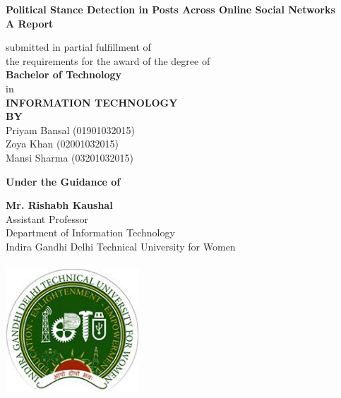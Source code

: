 \documentclass[a4paper,11pt]{article}
\begin{document}

\thispagestyle{empty} %

\begin{spacing}{1.5}
\begin{center}

{\LARGE \bfseries
Political Stance Detection in Posts Across Online Social Networks}
\medskip\\
\textbf{A Report}
\begin{center}
submitted in partial fulfillment of\\ 
the requirements for the award of the degree of\\
\textbf{Bachelor of Technology}
\medskip\\
in\\
\textbf{INFORMATION TECHNOLOGY}\\
\textbf{BY}
\medskip\\
Priyam Bansal (01901032015)\\
Zoya Khan (02001032015)\\
Mansi Sharma (03201032015)\\
\end{center}
\begin{center}
\textbf{Under the Guidance of}\\
\end{center}
\begin{center}
\textbf{Mr. Rishabh Kaushal}\\
Assistant Professor\\
Department of Information Technology\\
Indira Gandhi Delhi Technical University for Women
\end{center}
\vspace*{10mm}

\includegraphics[height=5cm,width=5cm]{igdtuw_logo.jpg}


\end{center}
\end{spacing}
\end{document}
